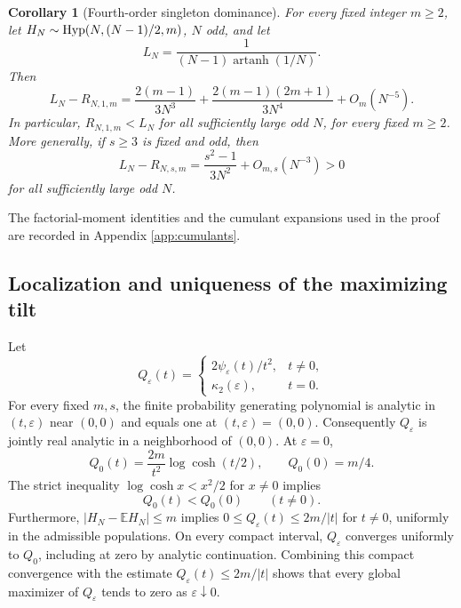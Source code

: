 \documentclass[11pt,a4paper]{article}
\newtheorem{corollary}[theorem]{Corollary}
\newcommand{\E}{\mathbb E}\newcommand{\R}{\mathbb R}\newcommand{\N}{\mathbb N}\newcommand{\one}{\mathbf1}
\begin{document}
\begin{corollary}[Fourth-order singleton dominance]\label{cor:fixedm_gap}
For every fixed integer $m\ge2$, let $H_N\sim\operatorname{Hyp}(N,(N-1)/2,m)$, $N$ odd, and let
\[
 L_N=\frac{1}{(N-1)\operatorname{artanh}(1/N)}.
\]
Then
\begin{equation}\label{eq:fixedgap}
 \boxed{\quad L_N-R_{N,1,m}
 =\frac{2(m-1)}{3N^3}
 +\frac{2(m-1)(2m+1)}{3N^4}+O_m(N^{-5}).\quad}
\end{equation}
In particular, $R_{N,1,m}<L_N$ for all sufficiently large odd $N$, for every fixed $m\ge2$. More generally, if $s\ge3$ is fixed and odd, then
\begin{equation}\label{eq:offs_gap}
 L_N-R_{N,s,m}=\frac{s^2-1}{3N^2}+O_{m,s}(N^{-3})>0
\end{equation}
for all sufficiently large odd $N$.
\end{corollary}

The factorial-moment identities and the cumulant expansions used in the proof are recorded in Appendix \ref{app:cumulants}.

\subsection{Localization and uniqueness of the maximizing tilt}
Let
\[
 Q_\varepsilon(t)=\begin{cases}
  2\psi_\varepsilon(t)/t^2,&t\ne0,\\
  \kappa_2(\varepsilon),&t=0.
 \end{cases}
\]
For every fixed $m,s$, the finite probability generating polynomial is analytic in $(t,\varepsilon)$ near $(0,0)$ and equals one at $(t,\varepsilon)=(0,0)$. Consequently $Q_\varepsilon$ is jointly real analytic in a neighborhood of $(0,0)$. At $\varepsilon=0$,
\begin{equation}\label{eq:q0}
 Q_0(t)=\frac{2m}{t^2}\log\cosh(t/2),\qquad Q_0(0)=m/4.
\end{equation}
The strict inequality $\log\cosh x<x^2/2$ for $x\ne0$ implies
\begin{equation}\label{eq:qstrict}
 Q_0(t)<Q_0(0)\qquad(t\ne0).
\end{equation}
Furthermore, $|H_N-\E H_N|\le m$ implies $0\le Q_\varepsilon(t)\le2m/|t|$ for $t\ne0$, uniformly in the admissible populations. On every compact interval, $Q_\varepsilon$ converges uniformly to $Q_0$, including at zero by analytic continuation. Combining this compact convergence with the estimate $Q_\varepsilon(t)\le2m/|t|$ shows that every global maximizer of $Q_\varepsilon$ tends to zero as $\varepsilon\downarrow0$.
\end{document}
